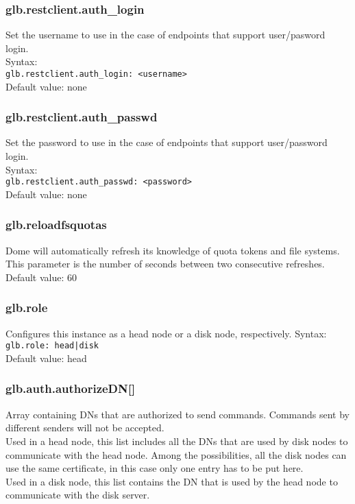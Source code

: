 \documentclass[a4paper,10pt]{scrreprt}
\begin{document}
\subsubsection{glb.restclient.auth\_login}
Set the username to use in the case of endpoints that support user/pasword login.\\
Syntax:\\
\lstinline"glb.restclient.auth_login: <username>"\\
Default value: none\\
\subsubsection{glb.restclient.auth\_passwd}
Set the password to use in the case of endpoints that support user/password login.\\
Syntax:\\
\lstinline"glb.restclient.auth_passwd: <password>"\\
Default value: none\\

\subsubsection{glb.reloadfsquotas}
Dome will automatically refresh its knowledge of quota tokens and file systems. This parameter is the number of seconds between two consecutive refreshes.\\
Default value: 60\\

\subsubsection{glb.role}
Configures this instance as a head node or a disk node, respectively.
Syntax:\\
\lstinline"glb.role: head|disk"\\
Default value: head\\

\subsubsection{glb.auth.authorizeDN[]}
Array containing DNs that are authorized to send commands. Commands sent by different senders will not be accepted.\\
Used in a head node, this list includes all the DNs that are used by disk nodes to communicate with the head node. Among the possibilities, all the disk nodes can use the same certificate, in this case only one entry has to be put here.\\
Used in a disk node, this list contains the DN that is used by the head node to communicate with the disk server.\\
\end{document}
